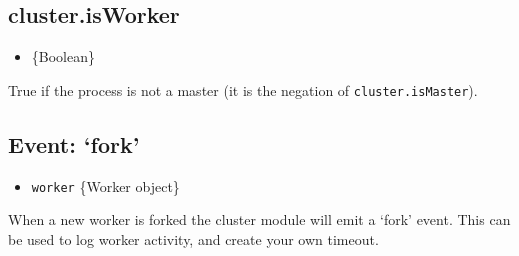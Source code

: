 \subsection{cluster.isWorker}\label{cluster.isworker}

\begin{itemize}
\itemsep1pt\parskip0pt
\item
  \{Boolean\}
\end{itemize}

True if the process is not a master (it is the negation of
\texttt{cluster.isMaster}).

\subsection{\texorpdfstring{Event:
`fork'}{Event: fork}}\label{event-fork}

\begin{itemize}
\itemsep1pt\parskip0pt
\item
  \texttt{worker} \{Worker object\}
\end{itemize}

When a new worker is forked the cluster module will emit a `fork' event.
This can be used to log worker activity, and create your own timeout.

\begin{Shaded}
\begin{Highlighting}[]
 
 \NormalTok{() \{}
  \NormalTok{(}\NormalTok{);}
\NormalTok{\}}

\NormalTok{(}\NormalTok{, }
  \NormalTok{timeouts[}\NormalTok{] = }\NormalTok{);}
\NormalTok{\});}
\NormalTok{(}\NormalTok{, }
  \NormalTok{(timeouts[}\NormalTok{]);}
\NormalTok{\});}
\NormalTok{(}\NormalTok{, }
  \NormalTok{(timeouts[}\NormalTok{]);}
  \NormalTok{();}
\NormalTok{\});}
\end{Highlighting}
\end{Shaded}

